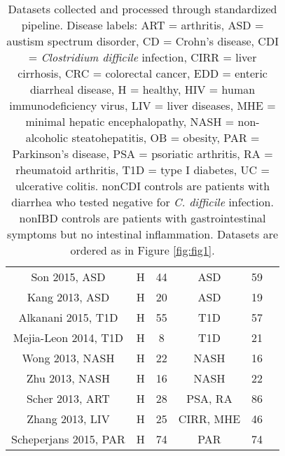 \documentclass{article}
\begin{document}
{{\begin{table}[h]
{\begin{tabular}{c c c c c c}
	Son 2015, ASD & H & 44 & ASD & 59 & \cite{asd-son} \\ 
	Kang 2013, ASD & H & 20 & ASD & 19 & \cite{asd-kb} \\ 
	Alkanani 2015, T1D & H & 55 & T1D & 57 & \cite{t1d-alkanani} \\ 
	Mejia-Leon 2014, T1D & H & 8 & T1D & 21 & \cite{t1d-mejia} \\ 
	Wong 2013, NASH & H & 22 & NASH & 16 & \cite{nash-chan} \\ 
	Zhu 2013, NASH & H & 16 & NASH & 22 & \cite{nash-baker} \\ 
	Scher 2013, ART & H & 28 & PSA, RA & 86 & \cite{ra-littman} \\ 
	Zhang 2013, LIV & H & 25 & CIRR, MHE & 46 & \cite{mhe-zhang} \\ 
	Scheperjans 2015, PAR & H & 74 & PAR & 74 & \cite{par-schep} \\ 
	\hline
\end{tabular}}
\caption{Datasets collected and processed through standardized pipeline. Disease labels: ART = arthritis, ASD = austism spectrum disorder, CD = Crohn's disease, CDI = \textit{Clostridium difficile} infection, CIRR = liver cirrhosis, CRC = colorectal cancer, EDD = enteric diarrheal disease, H = healthy, HIV = human immunodeficiency virus, LIV = liver diseases,  MHE =  minimal hepatic encephalopathy, NASH = non-alcoholic steatohepatitis, OB = obesity, PAR = Parkinson's disease, PSA = psoriatic arthritis, RA = rheumatoid arthritis, T1D = type I diabetes, UC = ulcerative colitis. nonCDI controls are patients with diarrhea who tested negative for \textit{C. difficile} infection. nonIBD controls are patients  with gastrointestinal symptoms but no intestinal inflammation. Datasets are ordered as in Figure \ref{fig:fig1}.}\label{tab:datasets}
\end{table}
}

}
\end{document}
